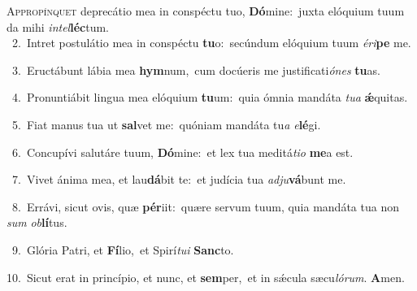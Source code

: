 \lettrine{\initial\textcolor{\initialcolor}{A}}{ppropínquet} deprecátio mea in conspéctu tuo, \textbf{Dó}\-mine:~\star juxta elóquium tuum da mihi \textit{in}\-\textit{tel}\textbf{léc}tum.\\
{\numbfont\textcolor{\numbcolor}{~2.}}~Intret postulátio mea in conspéctu \textbf{tu}\-o:~\star secúndum elóquium tuum \textit{é}\-\textit{ri}\textbf{pe} me.\par
{\numbfont\textcolor{\numbcolor}{~3.}}~Eructábunt lábia mea \textbf{hym}\-num,~\star cum docúeris me justificati\-\textit{ó}\-\textit{nes} \textbf{tu}\-as.\par
{\numbfont\textcolor{\numbcolor}{~4.}}~Pronuntiábit lingua mea elóquium \textbf{tu}\-um:~\star quia ómnia mandáta \textit{tu}\-\textit{a} \textbf{ǽ}\-quitas.\par
{\numbfont\textcolor{\numbcolor}{~5.}}~Fiat manus tua ut \textbf{sal}\-vet me:~\star quóniam mandáta tu\textit{a} \textit{e}\-\textbf{lé}gi.\par
{\numbfont\textcolor{\numbcolor}{~6.}}~Concupívi salutáre tuum, \textbf{Dó}\-mine:~\star et lex tua meditá\-\textit{ti}\-\textit{o} \textbf{me}\-a est.\par
{\numbfont\textcolor{\numbcolor}{~7.}}~Vivet ánima mea, et lau\-\textbf{dá}\-bit te:~\star et judícia tua \textit{ad}\-\textit{ju}\textbf{vá}bunt me.\par
{\numbfont\textcolor{\numbcolor}{~8.}}~Errávi, sicut ovis, quæ \textbf{pér}\-iit:~\star quære servum tuum, quia mandáta tua non \textit{sum} \textit{ob}\-\textbf{lí}tus.\par
{\numbfont\textcolor{\numbcolor}{~9.}}~Glória Patri, et \textbf{Fí}\-lio,~\star et Spirí\-\textit{tu}\-\textit{i} \textbf{Sanc}\-to.\par
{\numbfont\textcolor{\numbcolor}{10.}}~Sicut erat in princípio, et nunc, et \textbf{sem}\-per,~\star et in sǽcula sæcu\-\textit{ló}\-\textit{rum}. \textbf{A}\-men.\par
